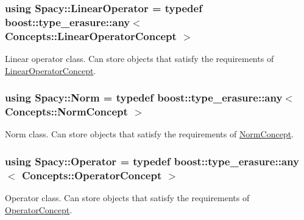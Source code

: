 \subsubsection[{Linear\+Operator}]{\setlength{\rightskip}{0pt plus 5cm}using {\bf Spacy\+::\+Linear\+Operator} = typedef boost\+::type\+\_\+erasure\+::any$<$ Concepts\+::\+Linear\+Operator\+Concept $>$}\label{group__SpacyGroup_ga584f7b9d82a844302ba0d77c3a1b6640_ga584f7b9d82a844302ba0d77c3a1b6640}


Linear operator class. Can store objects that satisfy the requirements of \hyperlink{group__ConceptGroup_gaf0e18e41c434cfceb77ccb8e785a8055_LinearOperatorConceptAnchor}{Linear\+Operator\+Concept}. 

\label{group__SpacyGroup_ga584f7b9d82a844302ba0d77c3a1b6640_LinearOperatorAnchor}%
\hypertarget{group__SpacyGroup_ga584f7b9d82a844302ba0d77c3a1b6640_LinearOperatorAnchor}{}%
\hypertarget{group__SpacyGroup_gaf4f33b11d657c48566d961a013c92bd1_gaf4f33b11d657c48566d961a013c92bd1}{}
\subsubsection[{Norm}]{\setlength{\rightskip}{0pt plus 5cm}using {\bf Spacy\+::\+Norm} = typedef boost\+::type\+\_\+erasure\+::any$<$ Concepts\+::\+Norm\+Concept $>$}\label{group__SpacyGroup_gaf4f33b11d657c48566d961a013c92bd1_gaf4f33b11d657c48566d961a013c92bd1}


Norm class. Can store objects that satisfy the requirements of \hyperlink{group__ConceptGroup_ga8b6032c46f6e31840a2c956c6360549b_NormConceptAnchor}{Norm\+Concept}. 

\label{group__SpacyGroup_gaf4f33b11d657c48566d961a013c92bd1_NormAnchor}%
\hypertarget{group__SpacyGroup_gaf4f33b11d657c48566d961a013c92bd1_NormAnchor}{}%
\hypertarget{group__SpacyGroup_ga3f89622eba80cf840b2a7102f1303455_ga3f89622eba80cf840b2a7102f1303455}{}
\subsubsection[{Operator}]{\setlength{\rightskip}{0pt plus 5cm}using {\bf Spacy\+::\+Operator} = typedef boost\+::type\+\_\+erasure\+::any$<$ Concepts\+::\+Operator\+Concept $>$}\label{group__SpacyGroup_ga3f89622eba80cf840b2a7102f1303455_ga3f89622eba80cf840b2a7102f1303455}


Operator class. Can store objects that satisfy the requirements of \hyperlink{group__ConceptGroup_ga7d984281b647a6d8e4c0a7ea5faeb90e_OperatorConceptAnchor}{Operator\+Concept}. 

